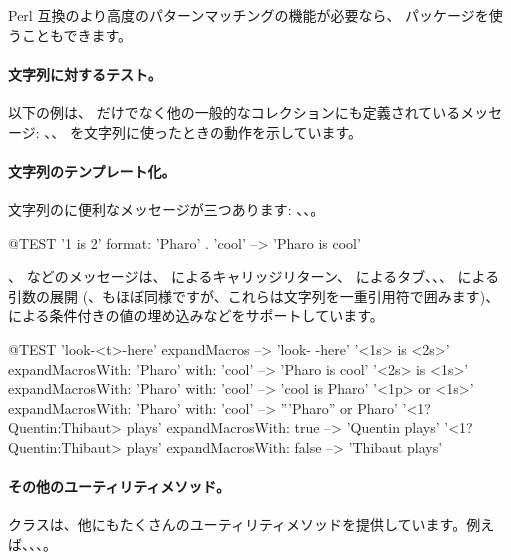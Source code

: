 \documentclass[a4paper,10pt,twoside]{book}
\begin{document}
Perl 互換のより高度のパターンマッチングの機能が必要なら、 パッケージを使うこともできます。

\paragraph{文字列に対するテスト。} 以下の例は、 だけでなく他の一般的なコレクションにも定義されているメッセージ: 、、 を文字列に使ったときの動作を示しています。


\paragraph{文字列のテンプレート化。}
文字列のに便利なメッセージが三つあります: 、、。

\begin{code}{@TEST}
'{1} is {2}' format: {'Pharo' . 'cool'}  --> 'Pharo is cool'
\end{code}

、 などのメッセージは、 によるキャリッジリターン、 によるタブ、、、 による引数の展開 (、もほぼ同様ですが、これらは文字列を一重引用符で囲みます)、 による条件付きの値の埋め込みなどをサポートしています。

\begin{code}{@TEST}
'look-<t>-here' expandMacros                                         --> 'look-	-here'
'<1s> is <2s>' expandMacrosWith: 'Pharo' with: 'cool'   --> 'Pharo is cool'
'<2s> is <1s>' expandMacrosWith: 'Pharo' with: 'cool'   --> 'cool is Pharo'
'<1p> or <1s>' expandMacrosWith: 'Pharo' with: 'cool'  --> '''Pharo'' or Pharo'
'<1?Quentin:Thibaut> plays' expandMacrosWith: true     --> 'Quentin plays'
'<1?Quentin:Thibaut> plays' expandMacrosWith: false    --> 'Thibaut plays'
\end{code}

\paragraph{その他のユーティリティメソッド。}
 クラスは、他にもたくさんのユーティリティメソッドを提供しています。例えば、、、。
\end{document}
